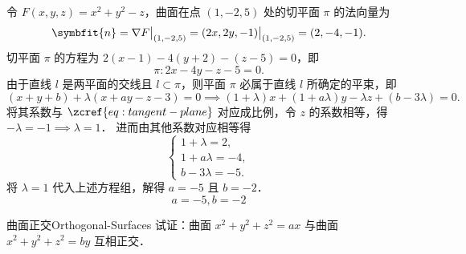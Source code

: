 \begin{solution}
    令 $F(x, y, z) = x^2 + y^2 - z$，曲面在点 $(1, -2, 5)$ 处的切平面 $\pi$ 的法向量为
    \begin{equation}
        \symbfit{n} = \nabla F \big|_{(1, -2, 5)} = (2x, 2y, -1) \big|_{(1, -2, 5)} = (2, -4, -1).
    \end{equation}
    切平面 $\pi$ 的方程为 $2(x - 1) - 4(y + 2) - (z - 5) = 0$，即
    \begin{equation}
        \pi: 2x - 4y - z - 5 = 0. \label{eq:tangent-plane}
    \end{equation}
    由于直线 $l$ 是两平面的交线且 $l \subset \pi$，则平面 $\pi$ 必属于直线 $l$ 所确定的平束，即
    \begin{equation}
        (x + y + b) + \lambda(x + ay - z - 3) = 0 \implies (1 + \lambda)x + (1 + a\lambda)y - \lambda z + (b - 3\lambda) = 0.
    \end{equation}
    将其系数与 $\zcref{eq:tangent-plane}$ 对应成比例，令 $z$ 的系数相等，得 $-\lambda = -1 \implies \lambda = 1$．
    进而由其他系数对应相等得
    \begin{equation}
        \begin{cases}
            1 + \lambda = 2,   \\
            1 + a\lambda = -4, \\
            b - 3\lambda = -5.
        \end{cases}
    \end{equation}
    将 $\lambda = 1$ 代入上述方程组，解得 $a = -5$ 且 $b = -2$．
    \begin{equation}
        \boxed{a = -5, b = -2}
    \end{equation}
\end{solution}


\begin{problem}{曲面正交}{Orthogonal-Surfaces}
    试证：曲面 $x^2 + y^2 + z^2 = ax$ 与曲面 $x^2 + y^2 + z^2 = by$ 互相正交．
\end{problem}

